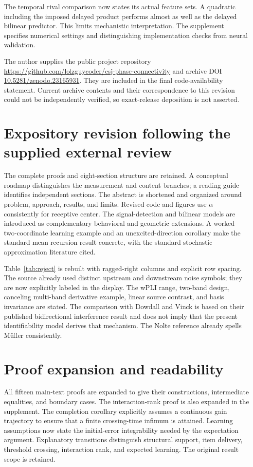 \documentclass[11pt,a4paper]{article}
\begin{document}
The temporal rival comparison now states its actual feature sets. A quadratic including the imposed delayed product performs almost as well as the delayed bilinear predictor. This limits mechanistic interpretation. The supplement specifies numerical settings and distinguishing implementation checks from neural validation.

The author supplies the public project repository \url{https://github.com/lolzguycoder/esj-phase-connectivity} and archive DOI \href{https://doi.org/10.5281/zenodo.23165931}{10.5281/zenodo.23165931}. They are included in the final code-availability statement. Current archive contents and their correspondence to this revision could not be independently verified, so exact-release deposition is not asserted.

\section*{Expository revision following the supplied external review}
The complete proofs and eight-section structure are retained. A conceptual roadmap distinguishes the measurement and content branches; a reading guide identifies independent sections. The abstract is shortened and organized around problem, approach, results, and limits. Revised code and figures use $\alpha$ consistently for receptive center. The signal-detection and bilinear models are introduced as complementary behavioral and geometric extensions. A worked two-coordinate learning example and an unexcited-direction corollary make the standard mean-recursion result concrete, with the standard stochastic-approximation literature cited.

Table~\ref{tab:reject} is rebuilt with ragged-right columns and explicit row spacing. The source already used distinct upstream and downstream noise symbols; they are now explicitly labeled in the display. The wPLI range, two-band design, canceling multi-band derivative example, linear source contrast, and basis invariance are stated. The comparison with Dowdall and Vinck is based on their published bidirectional interference result and does not imply that the present identifiability model derives that mechanism. The Nolte reference already spells M\"uller consistently.

\section*{Proof expansion and readability}
All fifteen main-text proofs are expanded to give their constructions, intermediate equalities, and boundary cases. The interaction-rank proof is also expanded in the supplement. The completion corollary explicitly assumes a continuous gain trajectory to ensure that a finite crossing-time infimum is attained. Learning assumptions now state the initial-error integrability needed by the expectation argument. Explanatory transitions distinguish structural support, item delivery, threshold crossing, interaction rank, and expected learning. The original result scope is retained.
\end{document}
